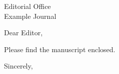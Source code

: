 \documentclass[paper=a4,fontsize=11pt]{scrlttr2}
\begin{document}
\begin{letter}{Editorial Office\\Example Journal}
\opening{Dear Editor,}
Please find the manuscript enclosed.
\closing{Sincerely,}
\end{letter}
\end{document}

